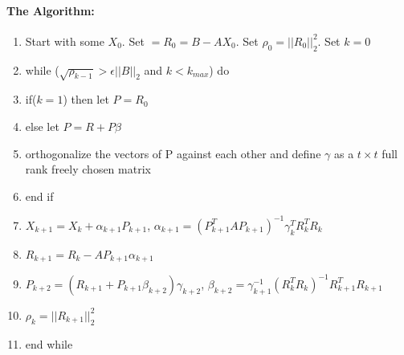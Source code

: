 \documentclass[]{scrartcl}
\begin{document}
\paragraph{The Algorithm:}
\begin{enumerate}
		\item Start with some $X_{0}$. Set $=R_{0}=B-AX_{0}$. Set $\rho_{0}=||R_{0}||_{2}^{2}$. Set $k=0$
		\item while ($\sqrt{\rho_{k-1}} > \epsilon ||B||_{2}$ and $k<k_{max}$) do
		\item \qquad if($k=1$) then let $P=R_{0}$ 
		\item \qquad else let $P=R+P\beta$
		\item \qquad \qquad orthogonalize the vectors of P against each other and define $\gamma$ as a $t\times t$ full rank freely chosen matrix  
		\item \qquad end if
		\item \qquad $X_{k+1}=X_{k}+\alpha_{k+1}P_{k+1}$, $\alpha_{k+1}=(P^{T}_{k+1}AP_{k+1})^{-1}\gamma_{k}^{T}R_{k}^{T}R_{k}$
		\item \qquad $R_{k+1}=R_{k}-AP_{k+1}\alpha_{k+1}$
		\item \qquad $P_{k+2}=(R_{k+1}+P_{k+1}\beta_{k+2})\gamma_{k+2}$, $\beta_{k+2}=\gamma_{k+1}^{-1}(R^{T}_{k}R_{k})^{-1}R^{T}_{k+1}R_{k+1}$
		\item \qquad $\rho_{k}=||R_{k+1}||_{2}^{2}$
		\item end while
\end{enumerate}
\end{document}
